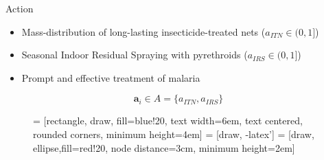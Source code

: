 \documentclass{beamer}
\begin{document}
\begin{frame}{Action}

\begin{itemize}
\item Mass-distribution of long-lasting insecticide-treated nets ($a_{ITN} \in (0,1]$)
\item Seasonal Indoor Residual Spraying with pyrethroids ($a_{IRS}\in (0,1]$)
\item Prompt and effective treatment of malaria  \cite{Stuckey2014}
\end{itemize}
\begin{equation}
\bm{a}_i \in A = \{a_{ITN}, a_{IRS}\}
\end{equation}

\begin{figure}[!t]
\centering
{} = [rectangle, draw, fill=blue!20, 
    text width=6em, text centered, rounded corners, minimum height=4em]
 = [draw, -latex']
 = [draw, ellipse,fill=red!20, node distance=3cm,
    minimum height=2em]
    
\label{fig_flow}
\end{figure}

\end{frame}
\end{document}
